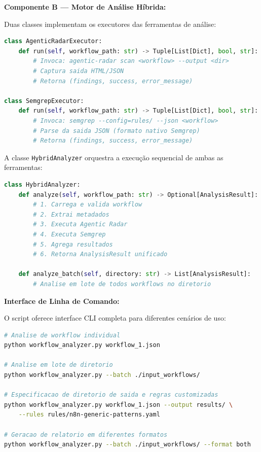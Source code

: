 \documentclass[12pt,a4paper]{article}
\begin{document}
\textbf{Componente B — Motor de Análise Híbrida:}

Duas classes implementam os executores das ferramentas de análise:

\begin{lstlisting}[language=Python, caption={Executores de análise}, label={lst:executors}]
class AgenticRadarExecutor:
    def run(self, workflow_path: str) -> Tuple[List[Dict], bool, str]:
        # Invoca: agentic-radar scan <workflow> --output <dir>
        # Captura saida HTML/JSON
        # Retorna (findings, success, error_message)

class SemgrepExecutor:
    def run(self, workflow_path: str) -> Tuple[List[Dict], bool, str]:
        # Invoca: semgrep --config=rules/ --json <workflow>
        # Parse da saida JSON (formato nativo Semgrep)
        # Retorna (findings, success, error_message)
\end{lstlisting}

A classe \texttt{HybridAnalyzer} orquestra a execução sequencial de ambas as ferramentas:

\begin{lstlisting}[language=Python, caption={Orquestrador de análise híbrida}, label={lst:orchestrator}]
class HybridAnalyzer:
    def analyze(self, workflow_path: str) -> Optional[AnalysisResult]:
        # 1. Carrega e valida workflow
        # 2. Extrai metadados
        # 3. Executa Agentic Radar
        # 4. Executa Semgrep
        # 5. Agrega resultados
        # 6. Retorna AnalysisResult unificado

    def analyze_batch(self, directory: str) -> List[AnalysisResult]:
        # Analise em lote de todos workflows no diretorio
\end{lstlisting}

\textbf{Interface de Linha de Comando:}

O script oferece interface CLI completa para diferentes cenários de uso:

\begin{lstlisting}[language=bash, caption={Exemplos de uso do CLI}, label={lst:cli}]
# Analise de workflow individual
python workflow_analyzer.py workflow_1.json

# Analise em lote de diretorio
python workflow_analyzer.py --batch ./input_workflows/

# Especificacao de diretorio de saida e regras customizadas
python workflow_analyzer.py workflow_1.json --output results/ \
    --rules rules/n8n-generic-patterns.yaml

# Geracao de relatorio em diferentes formatos
python workflow_analyzer.py --batch ./input_workflows/ --format both
\end{lstlisting}
\end{document}

